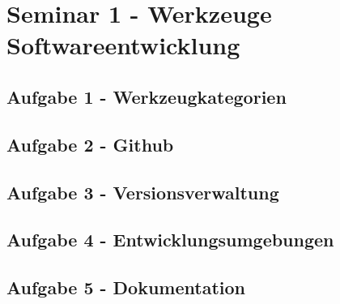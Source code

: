 	
\section{Seminar 1 - Werkzeuge Softwareentwicklung}

	\subsection{Aufgabe 1 - Werkzeugkategorien}
	
	\subsection{Aufgabe 2 - Github}
	
	\subsection{Aufgabe 3 - Versionsverwaltung}
	
	\subsection{Aufgabe 4 - Entwicklungsumgebungen}
	
	\subsection{Aufgabe 5 - Dokumentation}
	
